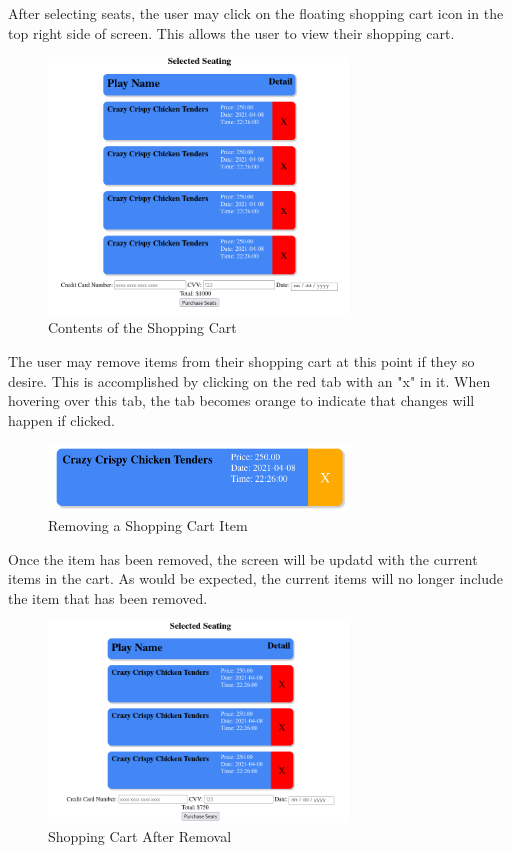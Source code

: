 After selecting seats, the user may click on the floating shopping cart icon in the top right side of screen. This allows the user to view their shopping cart.

\begin{figure}[ht]
    \centering
    \includegraphics[width=8cm]{images/chapter3/shopping cart contents}
    \caption{Contents of the Shopping Cart}
    \label{fig:shopping_cart_contents}
\end{figure}

The user may remove items from their shopping cart at this point if they so desire. This is accomplished by clicking on the red tab with an "x" in it. When hovering over this tab, the tab becomes orange to indicate that changes will happen if clicked.

\begin{figure}[ht]
    \centering
    \includegraphics[width=8cm]{images/chapter3/shopping cart item removal}
    \caption{Removing a Shopping Cart Item}
    \label{fig:shopping_cart_item_removal}
\end{figure}

Once the item has been removed, the screen will be updatd with the current items in the cart. As would be expected, the current items will no longer include the item that has been removed.

\begin{figure}[ht]
    \centering
    \includegraphics[width=8cm]{images/chapter3/shopping cart after removal}
    \caption{Shopping Cart After Removal}
    \label{fig:shopping_cart_after_removal}
\end{figure}

